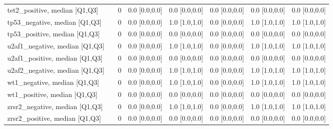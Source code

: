 \begin{tabular}{llllllll}
tet2\_positive, median [Q1,Q3] &    &                    0 &     0.0 [0.0,0.0] &           0.0 [0.0,0.0] &     0.0 [0.0,0.0] &             0.0 [0.0,0.0] &             0.0 [0.0,0.0] \\
tp53\_negative, median [Q1,Q3] &    &                    0 &     0.0 [0.0,0.0] &           1.0 [1.0,1.0] &     0.0 [0.0,0.0] &             1.0 [1.0,1.0] &             1.0 [1.0,1.0] \\
tp53\_positive, median [Q1,Q3] &    &                    0 &     0.0 [0.0,0.0] &           0.0 [0.0,0.0] &     0.0 [0.0,0.0] &             0.0 [0.0,0.0] &             0.0 [0.0,0.0] \\
u2af1\_negative, median [Q1,Q3] &    &                    0 &     0.0 [0.0,0.0] &           1.0 [1.0,1.0] &     0.0 [0.0,0.0] &             1.0 [1.0,1.0] &             1.0 [1.0,1.0] \\
u2af1\_positive, median [Q1,Q3] &    &                    0 &     0.0 [0.0,0.0] &           0.0 [0.0,0.0] &     0.0 [0.0,0.0] &             0.0 [0.0,0.0] &             0.0 [0.0,0.0] \\
u2af2\_negative, median [Q1,Q3] &    &                    0 &     0.0 [0.0,0.0] &           1.0 [1.0,1.0] &     0.0 [0.0,0.0] &             1.0 [1.0,1.0] &             1.0 [1.0,1.0] \\
wt1\_negative, median [Q1,Q3] &    &                    0 &     0.0 [0.0,0.0] &           1.0 [1.0,1.0] &     0.0 [0.0,0.0] &             1.0 [1.0,1.0] &             1.0 [1.0,1.0] \\
wt1\_positive, median [Q1,Q3] &    &                    0 &     0.0 [0.0,0.0] &           0.0 [0.0,0.0] &     0.0 [0.0,0.0] &             0.0 [0.0,0.0] &             0.0 [0.0,0.0] \\
zrsr2\_negative, median [Q1,Q3] &    &                    0 &     0.0 [0.0,0.0] &           1.0 [1.0,1.0] &     0.0 [0.0,0.0] &             1.0 [1.0,1.0] &             1.0 [1.0,1.0] \\
zrsr2\_positive, median [Q1,Q3] &    &                    0 &     0.0 [0.0,0.0] &           0.0 [0.0,0.0] &     0.0 [0.0,0.0] &             0.0 [0.0,0.0] &             0.0 [0.0,0.0] \\
\bottomrule
\end{tabular}
